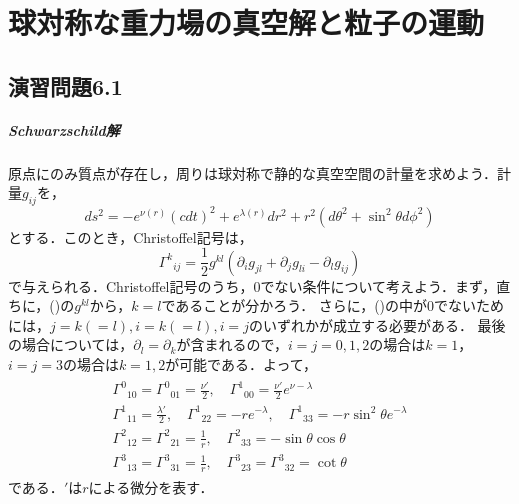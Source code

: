 \documentclass[a4paper]{ltjsreport}
\begin{document}
\chapter{球対称な重力場の真空解と粒子の運動}
\section*{演習問題6.1}
\paragraph{Schwarzschild解}
原点にのみ質点が存在し，周りは球対称で静的な真空空間の計量を求めよう．計量$g_{ij}$を，
\[ds^2= - e^{\nu(r)}(cdt)^2 + e^{\lambda(r)}dr^2 + r^2(d\theta^2 + \sin^2\theta{}d\phi^2)\]
とする．このとき，Christoffel記号は，
\[{\Gamma^k}_{ij}=\frac{1}{2}g^{kl}\left(\partial_ig_{jl} + \partial_jg_{li} - \partial_lg_{ij}\right)\]
で与えられる．Christoffel記号のうち，0でない条件について考えよう．まず，直ちに，()の$g^{kl}$から，$k=l$であることが分かろう．
さらに，()の中が0でないためには，$j=k(=l), i=k(=l), i=j$のいずれかが成立する必要がある．
最後の場合については，$\partial_l=\partial_k$が含まれるので，$i=j=0, 1, 2$の場合は$k=1$，$i=j=3$の場合は$k=1, 2$が可能である．よって，
\begin{align}
  \begin{split}
    {\Gamma^0}_{10}={\Gamma^0}_{01}=\frac{\nu'}{2}, \quad{}{\Gamma^1}_{00}=\frac{\nu'}{2}e^{\nu - \lambda}\\
    {\Gamma^1}_{11}=\frac{\lambda'}{2}, \quad{}{\Gamma^1}_{22}= - re^{ - \lambda}, \quad{}{\Gamma^1}_{33}= - r\sin^2\theta{}e^{ - \lambda}\\
    {\Gamma^2}_{12}={\Gamma^2}_{21}=\frac{1}{r}, \quad{\Gamma^2}_{33}= - \sin\theta\cos\theta\\
    {\Gamma^3}_{13}={\Gamma^3}_{31}=\frac{1}{r}, \quad{\Gamma^3}_{23}={\Gamma^3}_{32}=\cot\theta
  \end{split}
\end{align}
である．$'$は$r$による微分を表す．
\end{document}
